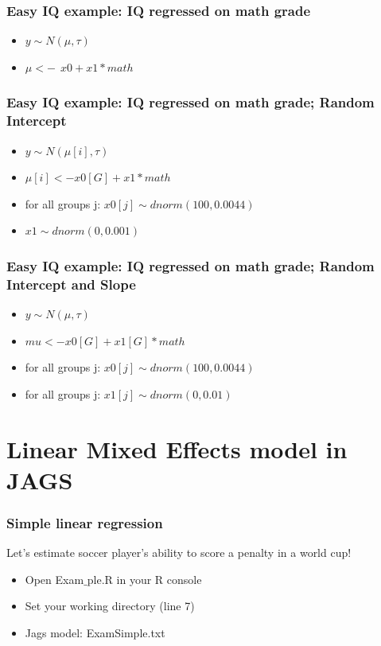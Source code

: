 \documentclass[hyperref={pdfpagelabels=false},unknownkeysallowed]{beamer}
\begin{document}
\begin{frame}
\frametitle{Easy IQ example: IQ regressed on math grade}
\begin{itemize}
\item $y \sim N(\mu,\tau)$
\item $\mu <- ~~x0 + x1 * math$
\end{itemize} 
\note{}
\end{frame}

\begin{frame}
\frametitle{Easy IQ example: IQ regressed on math grade; Random Intercept}
\begin{itemize}
\item $y \sim N(\mu[i],\tau)$
\item $\mu[i] <- x0[G] + x1 * math$
\item for all groups j: $x0[j] \sim dnorm(100,0.0044)$
\item $x1 \sim dnorm(0,0.001)$
\end{itemize} 
\note{}
\end{frame}

\begin{frame}
\frametitle{Easy IQ example: IQ regressed on math grade; Random Intercept and Slope}
\begin{itemize}
\item $y \sim N(\mu,\tau)$
\item $mu <- x0[G] + x1[G] * math$
\item for all groups j: $x0[j] \sim dnorm(100,0.0044)$
\item for all groups j: $x1[j] \sim dnorm(0,0.01)$
\end{itemize} 
\note{}
\end{frame}

\section{Linear Mixed Effects model in JAGS}

\begin{frame}
\frametitle{Simple linear regression}
Let's estimate soccer player's ability to score a penalty in a world cup! 
\begin{itemize}
\item Open Exam${\_}$ple.R in your R console
\item Set your working directory (line 7)
\item Jags model: ExamSimple.txt
\end{itemize}
\note{}
\end{frame}
\end{document}

